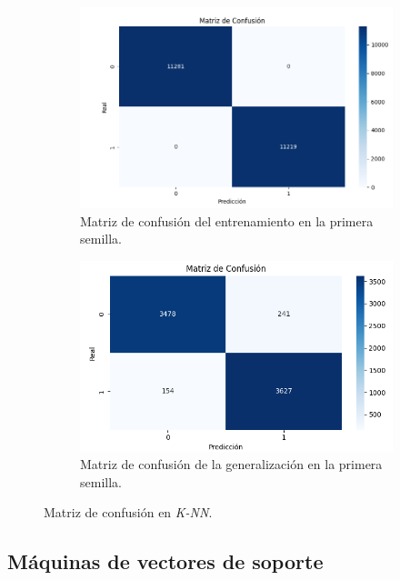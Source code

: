 \begin{figure}[H]
	\begin{subfigure}{.5\textwidth}
		\centering
		\includegraphics[width=1\linewidth]{Imagenes/knn_bin_mat_train}
		\caption{Matriz de confusión del entrenamiento en la primera semilla.}
		\label{fig:sub-first}
	\end{subfigure}
	\begin{subfigure}{.5\textwidth}
		\centering
		\includegraphics[width=1\linewidth]{Imagenes/knn_bin_mat_test}
		\caption{Matriz de confusión de la generalización en la primera semilla.}
		\label{fig:sub-second}
	\end{subfigure}
	\caption[Matriz de confusión en \textit{K-NN}]{Matriz de confusión en \textit{K-NN}.}
	\label{figT:knn_mat}
\end{figure}

\newpage
\subsection{Máquinas de vectores de soporte}
\label{subsec:svm_bin}

